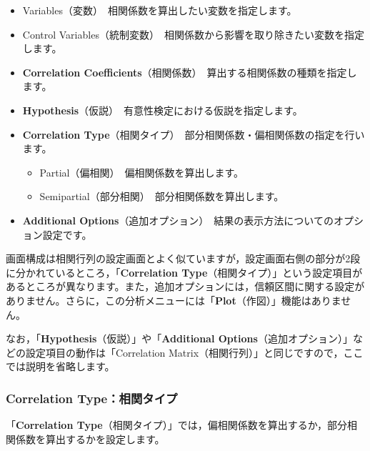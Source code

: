 \documentclass[
  12pt,
  a5jpaper,
  lualatex, ja=standard]{bxjsbook}
\providecommand{\tightlist}{%
  \setlength{\itemsep}{0pt}\setlength{\parskip}{0pt}}
\newenvironment{jmvsettings}{%
	\begin{center}%
	\begin{tcolorbox}[%
		title=設定項目,
		colframe=gmoji,
		colbacktitle=gmoji,
		colback=gmoji!2!white,
		breakable,
		width=.9\textwidth,
		]\small\addtolength{\leftmargini}{-3\labelsep}%
	}%
	{\end{tcolorbox}\end{center}}
\begin{document}
\begin{jmvsettings}

\begin{itemize}
\tightlist
\item
  Variables（変数）　相関係数を算出したい変数を指定します。
\item
  Control Variables（統制変数）　相関係数から影響を取り除きたい変数を指定します。
\item
  \textbf{Correlation Coefficients}（相関係数）　算出する相関係数の種類を指定します。
\item
  \textbf{Hypothesis}（仮説）　有意性検定における仮説を指定します。
\item
  \textbf{Correlation Type}（相関タイプ）　部分相関係数・偏相関係数の指定を行います。

  \begin{itemize}
  \tightlist
  \item
    Partial（偏相関）　偏相関係数を算出します。
  \item
    Semipartial（部分相関）　部分相関係数を算出します。
  \end{itemize}
\item
  \textbf{Additional Options}（追加オプション）　結果の表示方法についてのオプション設定です。
\end{itemize}

\end{jmvsettings}

画面構成は相関行列の設定画面とよく似ていますが，設定画面右側の部分が2段に分かれているところ，「\textbf{Correlation Type}（相関タイプ）」という設定項目があるところが異なります。また，追加オプションには，信頼区間に関する設定がありません。さらに，この分析メニューには「\textbf{Plot}（作図）」機能はありません。

なお，「\textbf{Hypothesis}（仮説）」や「\textbf{Additional Options}（追加オプション）」などの設定項目の動作は「Correlation Matrix（相関行列）」と同じですので，ここでは説明を省略します。

\hypertarget{correlation-typeux76f8ux95a2ux30bfux30a4ux30d7}{%
\subsubsection*{Correlation Type：相関タイプ}\label{correlation-typeux76f8ux95a2ux30bfux30a4ux30d7}}

「\textbf{Correlation Type}（相関タイプ）」では，偏相関係数を算出するか，部分相関係数を算出するかを設定します。
\end{document}
